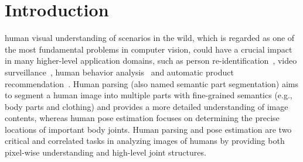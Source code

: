 \documentclass[10pt,journal,compsoc]{IEEEtran}
\begin{document}
\maketitle



\IEEEdisplaynontitleabstractindextext

\IEEEpeerreviewmaketitle


\ifCLASSOPTIONcompsoc
{}
\else
\section{Introduction}
\label{sec:introduction}
\fi


 human visual understanding of scenarios in the wild, which is regarded as one of the most fundamental problems in computer vision, could have a crucial impact in many higher-level application domains, such as person re-identification~\cite{zhao2013unsupervised}, video surveillance~\cite{wang2014deformable}, human behavior analysis~\cite{gan2016concepts,liang2015proposal} and automatic product recommendation~\cite{kalantidis2013getting}. Human parsing {(also named semantic part segmentation)} aims to segment a human image into multiple parts with fine-grained semantics (e.g., body parts and clothing) and provides a more detailed understanding of image contents, whereas human pose estimation focuses on determining the precise locations of important body joints. Human parsing and pose estimation are two critical and correlated tasks in analyzing images of humans by providing both pixel-wise understanding and high-level joint structures.
\end{document}
